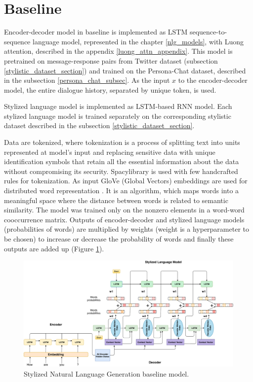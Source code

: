 \section{Baseline}
Encoder-decoder model in baseline is implemented as LSTM sequence-to-sequence language model, represented in the chapter \ref{nlg_models}, with Luong attention, described in the appendix \ref{luong_attn_appendix}. This model is pretrained on message-response pairs from Twitter dataset (subsection \ref{stylistic_dataset_section}) and trained on the Persona-Chat dataset, described in the subsection \ref{persona_chat_subsec}. As the input $x$ to the encoder-decoder model, the entire dialogue history, separated by unique token, is used.

Stylized language model is implemented as LSTM-based RNN model. Each stylized language model is trained separately on the corresponding stylistic dataset described in the subsection \ref{stylistic_dataset_section}.

Data are tokenized, where tokenization is a process of splitting text into units represented at model's input and replacing sensitive data with unique identification symbols that retain all the essential information about the data without compromising its security. Spacy\protect\footnotemark library is used with few handcrafted rules for tokenization. As input GloVe (Global Vectors) embeddings are used for distributed word representation \cite{pennington2014glove}. It is an algorithm, which maps words into a meaningful space where the distance between words is related to semantic similarity. The model was trained only on the nonzero elements in a word-word cooccurrence matrix. Outputs of encoder-decoder and stylized language models (probabilities of words) are multiplied by weights (weight is a hyperparameter to be chosen) to increase or decrease the probability of words and finally these outputs are added up (Figure \ref{implementation_architecture}).


\begin{figure}[hbt]
  \centering
  \includegraphics[width=1\textwidth]{figures/combine_models.pdf}
  \caption{Stylized Natural Language Generation baseline model.}
  \label{implementation_architecture}
\end{figure}

